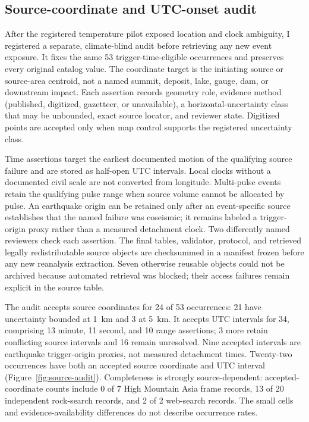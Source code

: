 \documentclass[11pt]{article}
\begin{document}
\subsection{Source-coordinate and UTC-onset audit}

After the registered temperature pilot exposed location and clock ambiguity, I
registered a separate, climate-blind audit before retrieving any new event
exposure. It fixes the same 53 trigger-time-eligible occurrences and preserves
every original catalog value. The coordinate target is the initiating source
or source-area centroid, not a named summit, deposit, lake, gauge, dam, or
downstream impact. Each assertion records geometry role, evidence method
(published, digitized, gazetteer, or unavailable), a horizontal-uncertainty
class that may be unbounded, exact source locator, and reviewer state.
Digitized points are accepted only when map control supports the registered
uncertainty class.

Time assertions target the earliest documented motion of the qualifying
source failure and are stored as half-open UTC intervals. Local clocks without
a documented civil scale are not converted from longitude. Multi-pulse events
retain the qualifying pulse range when source volume cannot be allocated by
pulse. An earthquake origin can be retained only after an event-specific
source establishes that the named failure was coseismic; it remains labeled a
trigger-origin proxy rather than a measured detachment clock. Two differently
named reviewers check each assertion. The final tables, validator, protocol,
and retrieved legally redistributable source objects are checksummed in a
manifest frozen before any new reanalysis extraction. Seven otherwise reusable
objects could not be archived because automated retrieval was blocked; their
access failures remain explicit in the source table.

The audit accepts source coordinates for 24 of 53 occurrences: 21 have
uncertainty bounded at 1~km and 3 at 5~km. It accepts UTC intervals for 34,
comprising 13 minute, 11 second, and 10 range assertions; 3 more retain
conflicting source intervals and 16 remain unresolved. Nine accepted intervals
are earthquake trigger-origin proxies, not measured detachment times. Twenty-two
occurrences have both an accepted source coordinate and UTC interval
(Figure~\ref{fig:source-audit}). Completeness is strongly source-dependent:
accepted-coordinate counts include 0 of 7 High Mountain Asia frame records,
13 of 20 independent rock-search records, and 2 of 2 web-search records. The
small cells and evidence-availability differences do not describe occurrence
rates.
\end{document}
